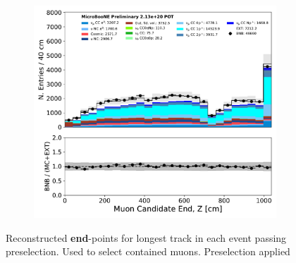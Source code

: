 \begin{figure}[H]
\begin{subfigure}[b]{0.3\textwidth}
        \end{subfigure}
        \begin{subfigure}[b]{0.3\textwidth}
        \centering
        \includegraphics[width=\textwidth]{NuMuCCsel/Images/Ryan/appendix_muonsel_input_R3/trk_sce_end_z_v_07232020_presel_samples_detsys_event_category.pdf}
        \end{subfigure}
    \caption{Reconstructed \textbf{end}-points for longest track in each event passing preselection. Used to select contained muons. Preselection applied}
    \label{fig::Appendix::constraint:inputvars:endpoints}
\end{figure}

